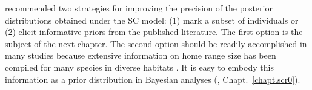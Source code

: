 


\citet{chandler_royle:2012} recommended two strategies for improving
the precision of the posterior distributions obtained under the SC
model: (1) mark a subset of individuals or (2) elicit informative
priors from the published literature.
The first option is the subject of the next chapter. The second option
should be readily accomplished in many studies %
because extensive information on home range size has
been compiled for many species in diverse habitats %
\citep[\emph{e.g.},][]{degraaf_yamasaki:2001}. It is
easy to embody this information as a prior distribution in Bayesian
analyses (\citet{chandler_royle:2012}, Chapt.~\ref{chapt.scr0}).

